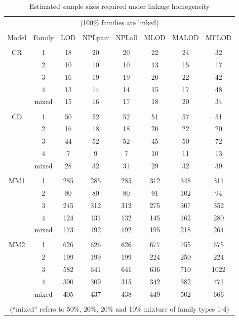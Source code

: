 \begin{table}[h]
\caption{Estimated sample sizes required under linkage homogeneity\label{lall}}
\centering
\begin{tabular}{cccccccc}
\multicolumn{8}{c}{(100\% families are linked)}\\
\\
\hline
Model&  Family &LOD   & NPLpair&NPLall& MLOD &  MALOD & MFLOD \\
\hline
\\
CR   &  1      &18    & 20     &20    & 22   &  24    & 32\\
     &  2      &10    & 10     &10    & 13   &  15    & 17\\
     &  3      &16    & 19     &19    & 20   &  22    & 42\\
     &  4      &13    & 14     &14    & 15   &  17    & 48\\
     &  mixed  &15    & 16     &17    & 18   &  20    & 34\\
\\
CD   &  1      &50    & 52     &52    & 51   &  57    & 51\\
     &  2      &16    & 18     &18    & 20   &  22    & 20\\
     &  3      &44    & 52     &52    & 45   &  50    & 72\\
     &  4      &7     & 9      &7     & 10   &  11    & 13\\
     &  mixed  &28    & 32     &31    & 29   &  32    & 39\\
\\
MM1  &  1      &285   & 285    &285   & 312  &  348   & 311\\
     &  2      &80    & 80     &80    & 91   &  102   & 94 \\
     &  3      &245   & 312    &312   & 275  &  307   & 352\\
     &  4      &124   & 131    &132   & 145  &  162   & 280\\
     &  mixed  &173   & 192    &192   & 195  &  218   & 264\\
\\
MM2  &  1      &626   & 626    &626   & 677  &  755   & 675\\
     &  2      &199   & 199    &199   & 224  &  250   & 224\\
     &  3      &582   & 641    &641   & 636  &  710   & 1022\\
     &  4      &300   & 309    &315   & 342  &  382   & 771\\
     &  mixed  &405   & 437    &438   & 449  &  502   & 666\\
\hline
\\
\multicolumn{8}{c}{(``mixed'' refers to 50\%, 20\%, 20\% and 10\% mixture of
family types 1-4)} \\
\end{tabular}
\end{table}

